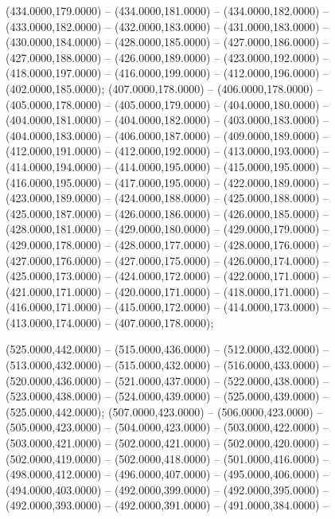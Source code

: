 \begin{scope}[shift={(-231.87,-121.87)}]
\begin{scope}[draw=black,fill=cfdae61,line join=round,line width=0.208pt]
        (434.0000,179.0000) -- (434.0000,181.0000) -- (434.0000,182.0000) --
        (433.0000,182.0000) -- (432.0000,183.0000) -- (431.0000,183.0000) --
        (430.0000,184.0000) -- (428.0000,185.0000) -- (427.0000,186.0000) --
        (427.0000,188.0000) -- (426.0000,189.0000) -- (423.0000,192.0000) --
        (418.0000,197.0000) -- (416.0000,199.0000) -- (412.0000,196.0000) --
        (402.0000,185.0000);
       (407.0000,178.0000) -- (406.0000,178.0000) --
        (405.0000,178.0000) -- (405.0000,179.0000) -- (404.0000,180.0000) --
        (404.0000,181.0000) -- (404.0000,182.0000) -- (403.0000,183.0000) --
        (404.0000,183.0000) -- (406.0000,187.0000) -- (409.0000,189.0000) --
        (412.0000,191.0000) -- (412.0000,192.0000) -- (413.0000,193.0000) --
        (414.0000,194.0000) -- (414.0000,195.0000) -- (415.0000,195.0000) --
        (416.0000,195.0000) -- (417.0000,195.0000) -- (422.0000,189.0000) --
        (423.0000,189.0000) -- (424.0000,188.0000) -- (425.0000,188.0000) --
        (425.0000,187.0000) -- (426.0000,186.0000) -- (426.0000,185.0000) --
        (428.0000,181.0000) -- (429.0000,180.0000) -- (429.0000,179.0000) --
        (429.0000,178.0000) -- (428.0000,177.0000) -- (428.0000,176.0000) --
        (427.0000,176.0000) -- (427.0000,175.0000) -- (426.0000,174.0000) --
        (425.0000,173.0000) -- (424.0000,172.0000) -- (422.0000,171.0000) --
        (421.0000,171.0000) -- (420.0000,171.0000) -- (418.0000,171.0000) --
        (416.0000,171.0000) -- (415.0000,172.0000) -- (414.0000,173.0000) --
        (413.0000,174.0000) -- (407.0000,178.0000);
  \end{scope}
  \begin{scope}[draw=black,fill=cffffbf,line join=round,line width=0.208pt]
       (525.0000,442.0000) -- (515.0000,436.0000) --
        (512.0000,432.0000) -- (513.0000,432.0000) -- (515.0000,432.0000) --
        (516.0000,433.0000) -- (520.0000,436.0000) -- (521.0000,437.0000) --
        (522.0000,438.0000) -- (523.0000,438.0000) -- (524.0000,439.0000) --
        (525.0000,439.0000) -- (525.0000,442.0000);
       (507.0000,423.0000) -- (506.0000,423.0000) --
        (505.0000,423.0000) -- (504.0000,423.0000) -- (503.0000,422.0000) --
        (503.0000,421.0000) -- (502.0000,421.0000) -- (502.0000,420.0000) --
        (502.0000,419.0000) -- (502.0000,418.0000) -- (501.0000,416.0000) --
        (498.0000,412.0000) -- (496.0000,407.0000) -- (495.0000,406.0000) --
        (494.0000,403.0000) -- (492.0000,399.0000) -- (492.0000,395.0000) --
        (492.0000,393.0000) -- (492.0000,391.0000) -- (491.0000,384.0000) --

\end{scope}
\end{scope}
